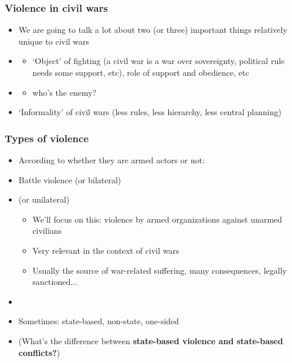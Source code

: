 \documentclass[aspectratio=43]{beamer}
\begin{document}
\begin{frame}
\frametitle{Violence in civil wars}
\centering

\begin{itemize}
  \item We are going to talk a lot about two (or three) important things relatively unique to civil wars
  \item<2->[1.] 
  \begin{itemize}
    \item `Object' of fighting (a civil war is a war over sovereignty, political rule needs some support, etc), role of support and obedience, etc
  \end{itemize}
  \item<3->[2.] 
  \begin{itemize}
    \item who's the enemy?
  \end{itemize}
  \item<4->[(*)] `Informality' of civil wars (less rules, less hierarchy, less central planning)
\end{itemize}

\end{frame}

\begin{frame}
\frametitle{Types of violence}
\centering

\begin{itemize}
  \item<1->[] According to whether they are armed actors or not:
  \item<2-> Battle violence (or bilateral)
  \item<2->  (or unilateral)
  \begin{itemize}
    \item<3-> We'll focus on this: violence by armed organizations against unarmed civilians
    \item<3-> Very relevant in the context of civil wars
    \item<3-> Usually the source of war-related suffering, many consequences, legally sanctioned...
  \end{itemize}
  \item[]
  \item<4-> Sometimes: state-based, non-state, one-sided
  \item<5-> (What's the difference between  \textbf{state-based violence and state-based conflicts?})
\end{itemize}

\end{frame}
\end{document}
